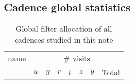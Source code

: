 \begin{appendices}

\section{Cadence global statistics}

  \begin{longtable}{l|ccccccc}
    \caption{Global filter allocation of all cadences studied in this note\label{tab:global_cadence_stats}\label{tab:global_cadence_stats}}        \\
    \hline
    \hline    
  name & \multicolumn{7}{c}{\# visits} \\
       & $u$ & $g$ & $r$ & $i$ & $z$ & $y$ & Total \\


\end{longtable}
\end{appendices}
